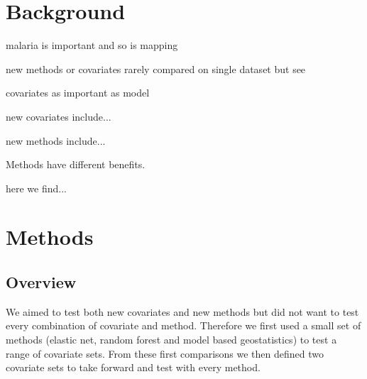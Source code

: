 \documentclass{bmcart}
\begin{document}


\section*{Background}

malaria is important and so is mapping


new methods or covariates rarely compared on single dataset
but see

covariates as important as model

new covariates include...

new methods include...

Methods have different benefits.

here we find...


\section*{Methods}

\subsection*{Overview}

We aimed to test both new covariates and new methods but did not want to test every combination of covariate and method.
Therefore we first used a small set of methods (elastic net, random forest and model based geostatistics) to test a range of covariate sets.
From these first comparisons we then defined two covariate sets to take forward and test with every method.
\end{document}
